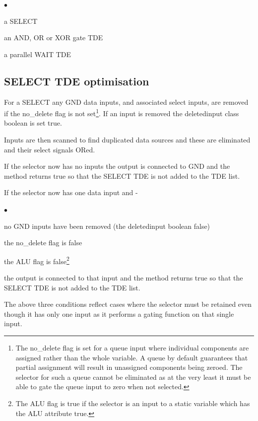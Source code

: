 \documentclass[10pt,a4paper,twoside,fleqn]{book}
\newcommand{\blist}{\begin{list}{$\bullet$}{\setlength{\itemsep}{-5pt}\setlength{\topsep}{-5pt}}}
\newcommand{\blend}{\end{list}}
\begin{document}
        \blist
        \item   a SELECT
        \item   an AND, OR or XOR gate TDE
        \item   a parallel WAIT TDE
        \blend
        
        \subsection{SELECT TDE optimisation}
        
            For a SELECT any GND data inputs, and associated select inputs, are
            removed if the no\_delete flag is not set\footnote{The no\_delete
            flag is set for a queue input where individual components are
            assigned rather than the whole variable. A queue by default
            guarantees that partial assignment will result in unassigned
            components being zeroed. The selector for such a queue cannot be
            eliminated as at the very least it must be able to gate the queue
            input to zero when not selected.}. If an input is removed the
            deletedinput class boolean is set true.
            
            Inputs are then scanned to find
            duplicated data sources and these are eliminated and their select
            signals ORed.
            
            If the selector now has no inputs the output is connected to GND and
            the method returns true so that the SELECT TDE is not added to the
            TDE list.
            
            If the selector now has one data input and -
            \blist
            \item   no GND inputs have been removed (the deletedinput boolean
                    false)
            \item   the no\_delete flag is false
            \item   the ALU flag is false\footnote{The ALU flag is true if the
                    selector is an input to a static variable which has the
                    ALU attribute true.}
            \blend
            the output is connected to that input and the method returns true so
            that the SELECT TDE is not added to the TDE list.
        
            The above three conditions reflect cases where the selector must
            be retained even though it has only one input as it performs a
            gating function on that single input.
            
\end{document}
